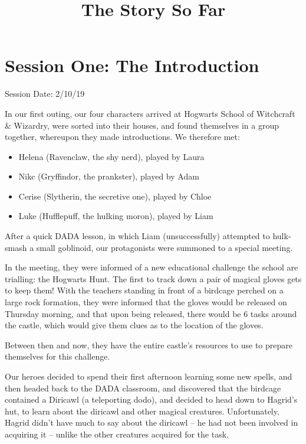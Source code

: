 \documentclass[oneside]{book}
\begin{document}
\title{{\HP The Story So Far}}

\maketitle

\section{Session One: The Introduction}

Session Date: 2/10/19

In our first outing, our four characters arrived at Hogwarts School of Witchcraft \& Wizardry, were sorted into their houses, and found themselves in a group together, whereupon they made introductions. We therefore met:
\begin{itemize}
	\item Helena (Ravenclaw, the shy nerd), played by Laura
	\item Nikc (Gryffindor, the prankster), played by Adam
	\item Cerise (Slytherin, the secretive one), played by Chloe
	\item Luke (Hufflepuff, the hulking moron), played by Liam
\end{itemize}
After a quick DADA lesson, in which Liam (unsuccessfully) attempted to hulk-smash a small goblinoid, our protagonists were summoned to a special meeting. 

In the meeting, they were informed of a new educational challenge the school are trialling: the Hogwarts Hunt. The first to track down a pair of magical gloves gets to keep them! With the teachers standing in front of a birdcage perched on a large rock formation, they were informed that the gloves would be released on Thursday morning, and that upon being released, there would be 6 tasks around the castle, which would give them clues as to the location of the gloves.

Between then and now, they have the entire castle's resources to use to prepare themselves for this challenge. 

Our heroes decided to spend their first afternoon learning some new spells, and then headed back to the DADA classroom, and discovered that the birdcage contained a Diricawl (a teleporting dodo), and decided to head down to Hagrid's hut, to learn about the diricawl and other magical creatures. Unfortunately, Hagrid didn't have much to say about the diricawl -- he had not been involved in acquiring it -- unlike the other creatures acquired for the task. 
\end{document}
